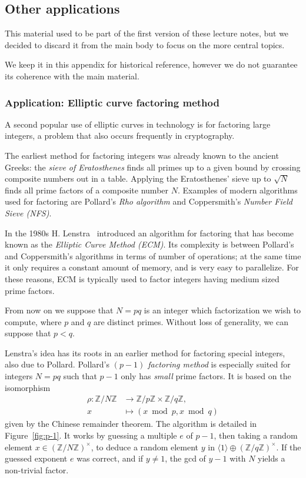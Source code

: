 \documentclass[10pt]{article}
\theoremstyle{plain}
\theoremstyle{definition}
\begin{document}
\begin{prposition}
\clearpage
\appendix
\part{Other applications}

This material used to be part of the first version of these lecture
notes, but we decided to discard it from the main body to focus on the
more central topics.

We keep it in this appendix for historical reference, however we do
not guarantee its coherence with the main material.

\section{Application: Elliptic curve factoring method}

A second popular use of elliptic curves in technology is for factoring
large integers, a problem that also occurs frequently in cryptography.

The earliest method for factoring integers was already known to the
ancient Greeks: the \emph{sieve of Eratosthenes} finds all primes up
to a given bound by crossing composite numbers out in a table. %
Applying the Eratosthenes' sieve up to $\sqrt{N}$ finds all prime
factors of a composite number $N$. %
Examples of modern algorithms used for factoring are Pollard's
\emph{Rho algorithm} and Coppersmith's \emph{Number Field Sieve
  (NFS)}.

In the 1980s H. Lenstra~\cite{lenstra87} introduced an algorithm for
factoring that has become known as the \emph{Elliptic Curve Method
  (ECM)}. %
Its complexity is between Pollard's and Coppersmith's algorithms in
terms of number of operations; at the same time it only requires a
constant amount of memory, and is very easy to parallelize. %
For these reasons, ECM is typically used to factor integers having
medium sized prime factors.

From now on we suppose that $N=pq$ is an integer which factorization
we wish to compute, where $p$ and $q$ are distinct primes. %
Without loss of generality, we can suppose that $p<q$.

Lenstra's idea has its roots in an earlier method for factoring
special integers, also due to Pollard. %
Pollard's \emph{$(p-1)$ factoring method} is especially suited for
integers $N=pq$ such that $p-1$ only has \emph{small} prime factors. %
It is based on the isomorphism
\begin{align*}
  \rho : ℤ/Nℤ &\to ℤ/pℤ × ℤ/qℤ,\\
  x &\mapsto (x \bmod p, x \bmod q)
\end{align*}
given by the Chinese remainder theorem. %
The algorithm is detailed in Figure~\ref{fig:p-1}. %
It works by guessing a multiple $e$ of $p-1$, then taking a random
element $x∈(ℤ/Nℤ)^{×}$, to deduce a random element $y$ in
$〈1〉⊕(ℤ/qℤ)^{×}$. If the guessed exponent $e$ was correct, and if
$y≠1$, the gcd of $y-1$ with $N$ yields a non-trivial factor. %


\end{prposition}
\end{document}
